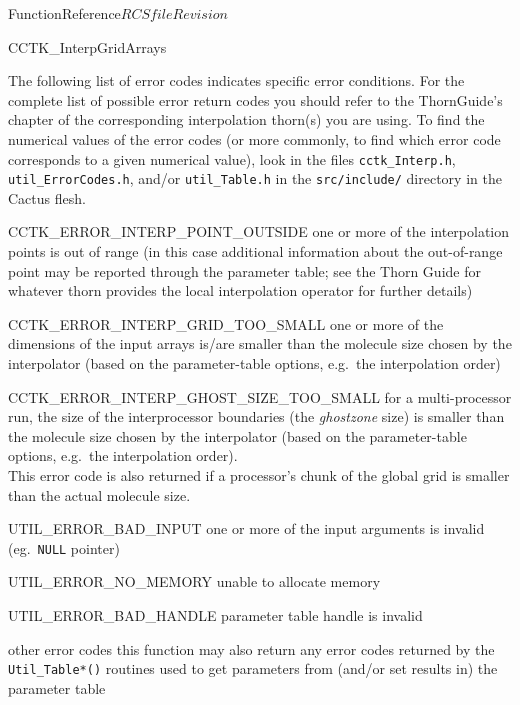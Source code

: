 \begin{cactuspart}{FunctionReference}{$RCSfile$}{$Revision$}
\begin{FunctionDescription}{CCTK\_InterpGridArrays}
\begin{ErrorSection}
\begin{Error}{}
The following list of error
codes indicates specific error conditions. For the complete list of possible
error return codes you should refer to the ThornGuide's chapter of the
corresponding interpolation thorn(s) you are using.  To find the numerical
values of the error codes (or more commonly, to find which error code
corresponds to a given numerical value), look in the files
\verb|cctk_Interp.h|, \verb|util_ErrorCodes.h|, and/or \verb|util_Table.h|
in the \verb|src/include/| directory in the Cactus flesh.
\end{Error}
\begin{Error}{CCTK\_ERROR\_INTERP\_POINT\_OUTSIDE}
one or more of the interpolation points is out of range
(in this case additional information about the out-of-range point
may be reported through the parameter table; see the Thorn Guide for
whatever thorn provides the local interpolation operator for further
details)
\end{Error}
\begin{Error}{CCTK\_ERROR\_INTERP\_GRID\_TOO\_SMALL}
one or more of the dimensions of the input arrays is/are smaller than
the molecule size chosen by the interpolator (based on the parameter-table
options, e.g.\ the interpolation order)
\end{Error}
\begin{Error}{CCTK\_ERROR\_INTERP\_GHOST\_SIZE\_TOO\_SMALL}
for a multi-processor run, the size of the interprocessor boundaries (the {\em ghostzone} size) is smaller than the molecule size chosen by the interpolator
(based on the parameter-table options, e.g.\ the interpolation order).\\
This error code is also returned if a processor's chunk of the global grid
is smaller than the actual molecule size.
\end{Error}
\begin{Error}{UTIL\_ERROR\_BAD\_INPUT}
one or more of the input arguments is invalid (eg.~\verb|NULL| pointer)
\end{Error}
\begin{Error}{UTIL\_ERROR\_NO\_MEMORY}
unable to allocate memory
\end{Error}
\begin{Error}{UTIL\_ERROR\_BAD\_HANDLE}
parameter table handle is invalid
\end{Error}
\begin{Error}{other error codes}
this function may also return any error codes returned by the
\verb|Util_Table*()| routines used to get parameters from
(and/or set results in) the parameter table
\end{Error}
\end{ErrorSection}


\end{FunctionDescription}
\end{cactuspart}

